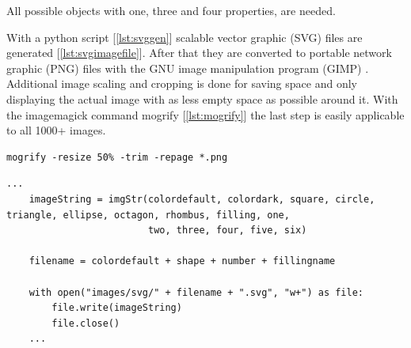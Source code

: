 All possible objects with one, three and four properties, are needed.

With a python script [\ref{lst:svggen}] scalable vector graphic (SVG) \cite{svg-tutorial} files are generated [\ref{lst:svgimagefile}].
After that they are converted to portable network graphic (PNG) files with the GNU image manipulation program (GIMP) \cite{gimp}.
Additional image scaling and cropping is done for saving space and only displaying the actual image with as less empty space as possible around it.
With the imagemagick command mogrify [\ref{lst:mogrify}] the last step is easily applicable to all 1000+ images.

\begin{lstlisting}[style=TypeScript, caption={ImageMagick console command "mogrify"}, label={lst:mogrify}]
    mogrify -resize 50% -trim -repage *.png
\end{lstlisting}

\begin{lstlisting}[style=TypeScript, caption={SVG Generation}, label={lst:svggen}]
    ...
    imageString = imgStr(colordefault, colordark, square, circle, triangle, ellipse, octagon, rhombus, filling, one,
                         two, three, four, five, six)

    filename = colordefault + shape + number + fillingname

    with open("images/svg/" + filename + ".svg", "w+") as file:
        file.write(imageString)
        file.close()
    ...
\end{lstlisting}

